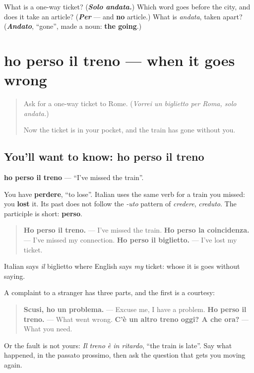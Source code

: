 \begin{tcolorbox}[breakable,colback=teal!4,colframe=teal!35!black,title={Before you move on}]
What is a one-way ticket? (\emph{\textbf{Solo andata.}}) Which word goes before the city, and does it take an article? (\emph{\textbf{Per}} — and \textbf{no} article.) What is \emph{andata}, taken apart? (\emph{\textbf{Andato}}, \textquotedblleft{}gone\textquotedblright{}, made a noun: \textbf{the going}.)
\end{tcolorbox}
\section[ho perso il treno]{ho perso il treno — when it goes wrong}

\label{lesson:IT-C268-ho-perso}



\begin{quote}
Ask for a one-way ticket to Rome. (\emph{Vorrei un biglietto per Roma, solo andata.})

Now the ticket is in your pocket, and the train has gone without you.
\end{quote}

\subsection*{You'll want to know: ho perso il treno}
\textbf{ho perso il treno} — \textquotedblleft{}I've missed the train\textquotedblright{}.

You have \textbf{perdere}, \textquotedblleft{}to lose\textquotedblright{}. Italian uses the same verb for a train you missed: you \textbf{lost} it. Its past does not follow the \emph{-uto} pattern of \emph{credere}, \emph{creduto}. The participle is short: \textbf{perso}.

\begin{quote}
\textbf{Ho perso il treno.} — I've missed the train. \textbf{Ho perso la coincidenza.} — I've missed my connection. \textbf{Ho perso il biglietto.} — I've lost my ticket.
\end{quote}

Italian says \emph{il} biglietto where English says \emph{my} ticket: whose it is goes without saying.

\begin{grammarlens}[title={Grammar Lens: reporting a problem}]
A complaint to a stranger has three parts, and the first is a courtesy:

\begin{quote}
\textbf{Scusi, ho un problema.} — Excuse me, I have a problem. \textbf{Ho perso il treno.} — What went wrong. \textbf{C'è un altro treno oggi? A che ora?} — What you need.
\end{quote}

Or the fault is not yours: \emph{Il treno è in ritardo}, \textquotedblleft{}the train is late\textquotedblright{}. Say what happened, in the passato prossimo, then ask the question that gets you moving again.
\end{grammarlens}

